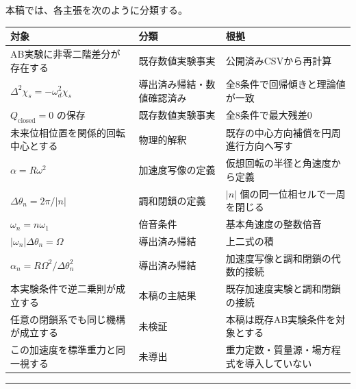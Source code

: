 \documentclass[
  10pt,
  a4paper,
]{ltjsarticle}
\newcounter{none} %
\begin{document}
本稿では、各主張を次のように分類する。

{\def\LTcaptype{none} %
\begin{longtable}[]{@{}
  >{\raggedright\arraybackslash}p{}
  >{\raggedright\arraybackslash}p{}
  >{\raggedright\arraybackslash}p{}@{}}
\toprule\noalign{}
\begin{minipage}[b]{\linewidth}\raggedright
対象
\end{minipage} & \begin{minipage}[b]{\linewidth}\raggedright
分類
\end{minipage} & \begin{minipage}[b]{\linewidth}\raggedright
根拠
\end{minipage} \\
\midrule\noalign{}
\endhead
\bottomrule\noalign{}
\endlastfoot
AB実験に非零二階差分が存在する & 既存数値実験事実 &
公開済みCSVから再計算 \\
\(\Delta^2\chi_s=-\omega_d^2\chi_s\) & 導出済み帰結・数値確認済み &
全8条件で回帰傾きと理論値が一致 \\
\(Q_{\mathrm{closed}}=0\) の保存 & 既存数値実験事実 &
全8条件で最大残差0 \\
未来位相位置を関係的回転中心とする & 物理的解釈 &
既存の中心方向補償を円周進行方向へ写す \\
\(\alpha=R\omega^2\) & 加速度写像の定義 &
仮想回転の半径と角速度から定義 \\
\(\Delta\theta_n=2\pi/\lvert n\rvert\) & 調和閉鎖の定義 &
\(\lvert n\rvert\) 個の同一位相セルで一周を閉じる \\
\(\omega_n=n\omega_1\) & 倍音条件 & 基本角速度の整数倍音 \\
\(\lvert\omega_n\rvert\Delta\theta_n=\Omega\) & 導出済み帰結 &
上二式の積 \\
\(\alpha_n=R\Omega^2/\Delta\theta_n^2\) & 導出済み帰結 &
加速度写像と調和閉鎖の代数的接続 \\
本実験条件で逆二乗則が成立する & 本稿の主結果 &
既存加速度実験と調和閉鎖の接続 \\
任意の閉鎖系でも同じ機構が成立する & 未検証 &
本稿は既存AB実験条件を対象とする \\
この加速度を標準重力と同一視する & 未導出 &
重力定数・質量源・場方程式を導入していない \\
\end{longtable}
}

\begin{center}\rule{0.5\linewidth}{0.5pt}\end{center}
\end{document}
